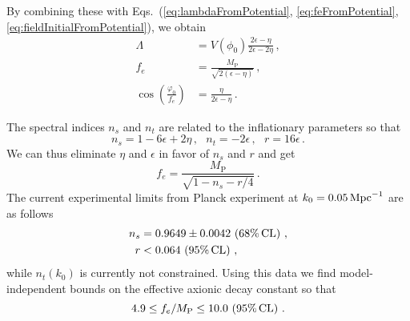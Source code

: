 \documentclass[12pt]{article}
\begin{document}
By combining these with Eqs.~(\ref{eq:lambdaFromPotential}, \ref{eq:feFromPotential}, \ref{eq:fieldInitialFromPotential}), we obtain
\begin{align} %
  \label{eq:lambdaSlowRoll}
  \Lambda &= V\left(\phi_0\right) \frac{2 \epsilon - \eta}{2 \epsilon - 2 \eta}\,,\\
  \label{eq:feSlowRoll}
  f_e &= \frac{M_\text{P}}{\sqrt{2 \left(\epsilon - \eta\right)}}\,,\\
  \label{eq:fieldInitialSlowRoll}
  \cos\left(\frac{\varphi_0}{f_e}\right) &= \frac{\eta}{2 \epsilon - \eta}\,.
\end{align}

The spectral indices $n_s$ and $n_t$ are related to the inflationary parameters so that
\begin{equation} \label{eq:observablesSlowRoll}
  n_s = 1 - 6 \epsilon + 2 \eta\,,
  ~~~ n_t = -2 \epsilon\,,
  ~~~ r = 16 \epsilon\,.
\end{equation}
We can thus eliminate $\eta$ and $\epsilon$ in favor of $n_s$ and $r$ and get
\begin{equation} \label{eq:feSpectralIndices}
  f_e = \frac{M_\text{P}}{\sqrt{1 - n_s - r / 4}}\,.
\end{equation}
The current experimental limits from Planck experiment at $k_0 = 0.05\,{\rm Mpc}^{-1}$ are as follows~\cite{Akrami:2018vks, Akrami:2018odb, Array:2015xqh}
\begin{equation} \label{data}
  \begin{aligned}
    n_s &= 0.9649 \pm 0.0042\, \left(68\%\, {\rm CL}\right)\,,\\
      r &< 0.064\, \left(95\%\, {\rm CL}\right)\,,
  \end{aligned}
\end{equation}
while $n_t\left(k_0\right)$ is currently not constrained.
Using this data we find model-independent bounds on the effective axionic decay constant so that
\begin{equation} \label{eq:feExperimentalConstraint}
  4.9 \leq f_e / M_\text{P} \leq 10.0\, \left(95\%\, {\rm CL}\right)\,.
\end{equation}
\end{document}
